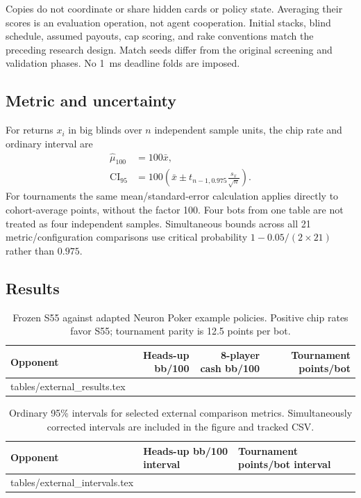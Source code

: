 \documentclass[11pt,letterpaper]{article}
\makeatletter
\newcommand{\inputtable}[1]{\@@input #1 }
\makeatother
\begin{document}
Copies do not coordinate or share hidden cards or policy state. Averaging
their scores is an evaluation operation, not agent cooperation. Initial
stacks, blind schedule, assumed payouts, cap scoring, and rake conventions
match the preceding research design. Match seeds differ from the original
screening and validation phases. No 1~ms deadline folds are imposed.

\subsection{Metric and uncertainty}
For returns $x_i$ in big blinds over $n$ independent sample units, the chip
rate and ordinary interval are
\begin{align}
\widehat{\mu}_{100}&=100\bar{x},\\
\mathrm{CI}_{95}&=100\left(\bar{x}\pm t_{n-1,0.975}
\frac{s_x}{\sqrt{n}}\right).
\end{align}
For tournaments the same mean/standard-error calculation applies directly
to cohort-average points, without the factor 100. Four bots from one table
are not treated as four independent samples. Simultaneous bounds across all
21 metric/configuration comparisons use critical probability
$1-0.05/(2\times21)$ rather than $0.975$.

\subsection{Results}
\begin{table}[htbp]
\centering\small
\caption{Frozen S55 against adapted Neuron Poker example policies. Positive chip rates favor S55; tournament parity is 12.5 points per bot.}
\label{tab:external}
\begin{tabular}{@{}lrrr@{}}
\toprule Opponent & Heads-up bb/100 & 8-player cash bb/100 & Tournament points/bot \\\midrule
\inputtable{tables/external_results.tex}
\bottomrule
\end{tabular}
\end{table}

\begin{table}[htbp]
\centering\small
\caption{Ordinary 95\% intervals for selected external comparison metrics. Simultaneously corrected intervals are included in the figure and tracked CSV.}
\begin{tabular}{@{}lll@{}}
\toprule Opponent & Heads-up bb/100 interval & Tournament points/bot interval \\\midrule
\inputtable{tables/external_intervals.tex}
\bottomrule
\end{tabular}
\end{table}
\end{document}
